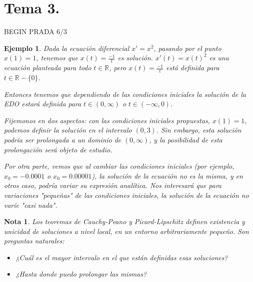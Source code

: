 \documentclass{article}
\theoremstyle{theorem-style}  %
\theoremstyle{definition-style}
\newtheorem*{note}{Nota} %
\theoremstyle{example-style}
\newtheorem{example}{Ejemplo}[section]
\begin{document}
\section{Tema 3.}
BEGIN PRADA 6/3
\begin{example}
	Dada la ecuación diferencial $ x'=x^2 $, pasando por el punto $ x(1)=1 $, tenemos que $ x(t)=\frac{-1}{t} $ es solución. $ x'(t)=x(t)^2 $ es una ecuación planteada para todo $ t \in \mathbb{R} $, pero $ x(t)=\frac{-1}{t} $ está definida para $ t \in \mathbb{R}-\{0\} $.
	
	Entonces tenemos que dependiendo de las condiciones iniciales la solución de la EDO estará definida para $ t\in (0,\infty) $ o $ t\in (-\infty,0) $.
	
	Fijemonos en dos aspectos: con las condiciones iniciales propuestas, $ x(1)=1 $, podemos definir la solución en el intervalo $ (0,3) $. Sin embargo, esta solución podría ser prolongada a un dominio de $ (0,\infty) $, y la posibilidad de esta prolongación será objeto de estudio.
	
	Por otra parte, vemos que al cambiar las condiciones iniciales (por ejemplo, $ x_0=-0.0001 $ o $ x_0=0.00001 $), la solución de la ecuación no es la misma, y en otros caso, podría variar su expresión analítica. Nos interesará que para variaciones "pequeñas" de las condiciones iniciales, la solución de la ecuación no varíe "casi nada".
\end{example}

\begin{note}
	Los teoremas de Cauchy-Peano y Picard-Lipschitz definen existencia y unicidad de soluciones a nivel local, en un entorno arbitrariamente pequeño. Son preguntas naturales: \begin{itemize}
		\item ¿Cuál es el mayor intervalo en el que están definidas esas soluciones?
		\item ¿Hasta donde puedo prolongar las mismas?
	\end{itemize}
\end{note}
\end{document}
